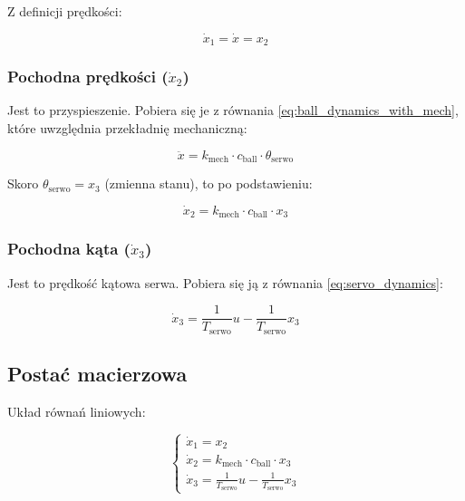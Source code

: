Z definicji prędkości:

\begin{equation}
\dot{x}_1 = \dot{x} = x_2
\end{equation}

\subsubsection{Pochodna prędkości ($\dot{x}_2$)}

Jest to przyspieszenie. Pobiera się je z równania \eqref{eq:ball_dynamics_with_mech}, które uwzględnia przekładnię mechaniczną:

\begin{equation}
\ddot{x} = k_{\mathrm{mech}} \cdot c_{\mathrm{ball}} \cdot \theta_{\mathrm{serwo}}
\end{equation}

Skoro $\theta_{\mathrm{serwo}} = x_3$ (zmienna stanu), to po podstawieniu:

\begin{equation}
\dot{x}_2 = k_{\mathrm{mech}} \cdot c_{\mathrm{ball}} \cdot x_3
\end{equation}

\subsubsection{Pochodna kąta ($\dot{x}_3$)}

Jest to prędkość kątowa serwa. Pobiera się ją z równania \eqref{eq:servo_dynamics}:

\begin{equation}
\dot{x}_3 = \frac{1}{T_{\mathrm{serwo}}} u - \frac{1}{T_{\mathrm{serwo}}} x_3
\end{equation}

\subsection{Postać macierzowa}

Układ równań liniowych:

\begin{equation}
\begin{cases}
\dot{x}_1 = x_2 \\
\dot{x}_2 = k_{\mathrm{mech}} \cdot c_{\mathrm{ball}} \cdot x_3 \\
\dot{x}_3 = \frac{1}{T_{\mathrm{serwo}}} u - \frac{1}{T_{\mathrm{serwo}}} x_3
\end{cases}
\end{equation}

